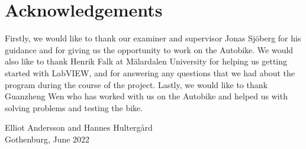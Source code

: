 \thispagestyle{plain}			%
\section*{Acknowledgements}

Firstly, we would like to thank our examiner and supervisor Jonas Sjöberg for his guidance and for giving us the opportunity to work on the Autobike. We would also like to thank Henrik Falk at Mälardalen University for helping us getting started with LabVIEW, and for answering any questions that we had about the program during the course of the project. Lastly, we would like to thank Guanzheng Wen who has worked with us on the Autobike and helped us with solving problems and testing the bike.

\vspace{1.5cm}
\begin{flushright}
    Elliot Andersson and Hannes Hultergård\\
    Gothenburg, June 2022
\end{flushright}

\newpage				%
\thispagestyle{empty}
\mbox{}